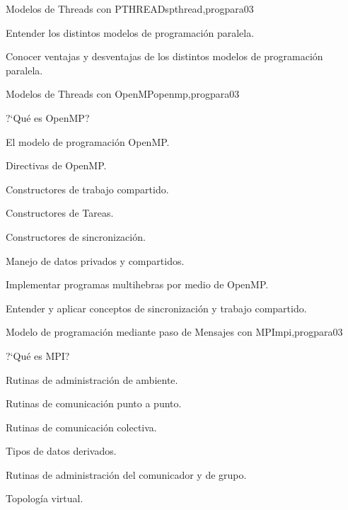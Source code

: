 \begin{syllabus}
\begin{unit}{Modelos de Threads con PTHREADs}{pthread,progpara}{0}{3}
\begin{learningoutcomes}
	\item Entender los distintos modelos de programación paralela.
	\item Conocer ventajas y desventajas de los distintos modelos de programación paralela.
\end{learningoutcomes}
\end{unit}

\begin{unit}{Modelos de Threads con OpenMP}{openmp,progpara}{0}{3}
\begin{topics}
         \item ?`Qué es OpenMP?
         \item El modelo de programación OpenMP.
         \item Directivas de OpenMP.
         \item Constructores de trabajo compartido.
         \item Constructores de Tareas.
         \item Constructores de sincronización.
	 \item Manejo de datos privados y compartidos.
\end{topics}

\begin{learningoutcomes}
	\item Implementar programas multihebras por medio de OpenMP.
	\item Entender y aplicar conceptos de sincronización y trabajo compartido.
\end{learningoutcomes}
\end{unit}

\begin{unit}{Modelo de programación mediante paso de Mensajes con MPI}{mpi,progpara}{0}{3}
\begin{topics}
         \item ?`Qué es MPI?
         \item Rutinas de administración de ambiente.
         \item Rutinas de comunicación punto a punto.
         \item Rutinas de comunicación colectiva.
         \item Tipos de datos derivados.
         \item Rutinas de administración del comunicador y de grupo.
	 \item Topología virtual.
\end{topics}


\end{unit}
\end{syllabus}
